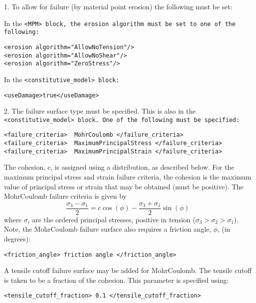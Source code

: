 \begin{enumerate}
1. To allow for failure (by material point erosion) the following must be set: 

In the \tt <MPM> \normalfont block, the erosion algorithm must be set to one of the following: 

\begin{Verbatim}[fontsize=\footnotesize]
<erosion algorithm="AllowNoTension"/>
<erosion algorithm="AllowNoShear"/>
<erosion algorithm="ZeroStress"/>
\end{Verbatim}

In the \tt <constitutive\_model> \normalfont block:
\begin{Verbatim}[fontsize=\footnotesize]
<useDamage>true</useDamage>
\end{Verbatim}

2. The failure surface type must be specified.  This is also in the \tt <constitutive\_model> \normalfont 
block.  One of the following must be specified:

\begin{Verbatim}[fontsize=\footnotesize]
<failure_criteria>  MohrCoulomb </failure_criteria>
<failure_criteria>  MaximumPrincipalStress </failure_criteria>
<failure_criteria>  MaximumPrincipalStrain </failure_criteria>
\end{Verbatim}

The cohesion, $c$, is assigned using a distribution, as described below.  For the maximum 
principal stress and strain failure criteria, the cohesion is the maximum value of principal 
stress or strain that may be obtained (must be positive).  The MohrCoulomb failure criteria is
given by 
\begin{equation}
\frac{\sigma_3-\sigma_1}{2}=c\cos(\phi)-\frac{\sigma_3+\sigma_1}{2}\sin(\phi)
\end{equation}
where $\sigma_i$ are the ordered principal stresses, positive in tension 
($\sigma_3 > \sigma_2 > \sigma_1$).  Note, the MohrCoulomb failure 
surface also requires a friction angle, $\phi$, (in degrees):

\begin{Verbatim}[fontsize=\footnotesize]
<friction_angle> friction angle </friction_angle>
\end{Verbatim}

A tensile cutoff failure surface may be added for MohrCoulomb.
The tensile cutoff is taken to be a fraction of the cohesion.  
This parameter is specified using:

\begin{Verbatim}[fontsize=\footnotesize]
<tensile_cutoff_fraction> 0.1 </tensile_cutoff_fraction> 
\end{Verbatim}


\end{enumerate}
